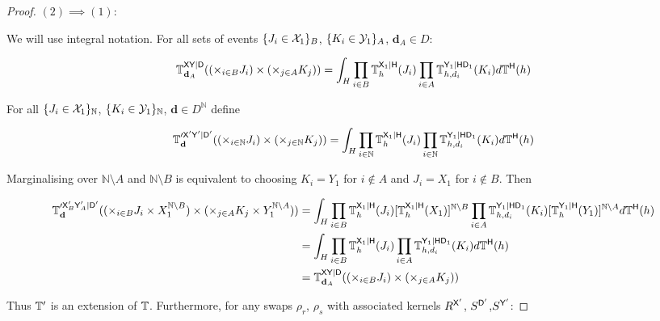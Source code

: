 \begin{proof}
$(2)\implies (1)$:

We will use integral notation. For all sets of events $\{J_i\in \mathcal{X}_1\}_B$, $\{K_i\in \mathcal{Y}_1\}_A$, $\mathbf{d}_A\in D$:

\begin{align}
  \mathbb{T}^{\mathsf{X}\mathsf{Y}|\mathsf{D}}_{\mathbf{d}_A}((\times_{i\in B}J_i)\times (\times_{j\in A} K_j)) = \int_{H} \prod_{i\in B} \mathbb{T}^{\mathsf{X}_1|\mathsf{H}}_h(J_i)\prod_{i\in A}\mathbb{T}_{h,d_i}^{\mathsf{Y}_1|\mathsf{H}\mathsf{D}_1}(K_i)d\mathbb{T}^{\mathsf{H}}(h)
\end{align}

For all $\{J_i\in \mathcal{X}_1\}_\mathbb{N}$, $\{K_i\in \mathcal{Y}_1\}_\mathbb{N}$, $\mathbf{d} \in D^{\mathbb{N}}$ define

\begin{align}
  \mathbb{T}^{\prime \mathsf{X}'\mathsf{Y}'|\mathsf{D}'}_{\mathbf{d}}((\times_{i\in \mathbb{N}}J_i)\times (\times_{j\in \mathbb{N}} K_j)) = \int_{H} \prod_{i\in \mathbb{N}} \mathbb{T}^{\mathsf{X}_1|\mathsf{H}}_h(J_i)\prod_{i\in \mathbb{N}}\mathbb{T}_{h,d_i}^{\mathsf{Y}_1|\mathsf{H}\mathsf{D}_1}(K_i)d\mathbb{T}^{\mathsf{H}}(h)
\end{align}

Marginalising over $\mathbb{N}\setminus A$ and $\mathbb{N}\setminus B$ is equivalent to choosing $K_i=Y_1$ for $i\not\in A$ and $J_i=X_1$ for $i\not\in B$. Then

\begin{align}
  \mathbb{T}^{\prime \mathsf{X}'_B\mathsf{Y}'_A|\mathsf{D}'}_{\mathbf{d}}((\times_{i\in B}J_i\times X_1^{\mathbb{N}\setminus B})\times (\times_{j\in A} K_j\times Y_1^{\mathbb{N}\setminus A})) &= \int_{H} \prod_{i\in B} \mathbb{T}^{\mathsf{X}_1|\mathsf{H}}_h(J_i) [\mathbb{T}^{\mathsf{X}_1|\mathsf{H}}_h (X_1)]^{\mathbb{N}\setminus B} \prod_{i\in A}\mathbb{T}_{h,d_i}^{\mathsf{Y}_1|\mathsf{H}\mathsf{D}_1}(K_i)[\mathbb{T}^{\mathsf{Y}_1|\mathsf{H}}_h (Y_1)]^{\mathbb{N}\setminus A}d\mathbb{T}^{\mathsf{H}}(h)\\
  &= \int_{H} \prod_{i\in B} \mathbb{T}^{\mathsf{X}_1|\mathsf{H}}_h(J_i) \prod_{i\in A}\mathbb{T}_{h,d_i}^{\mathsf{Y}_1|\mathsf{H}\mathsf{D}_1}(K_i)d\mathbb{T}^{\mathsf{H}}(h)\\
  &= \mathbb{T}^{\mathsf{X}\mathsf{Y}|\mathsf{D}}_{\mathbf{d}_A}((\times_{i\in B}J_i)\times (\times_{j\in A} K_j))
\end{align}

Thus $\mathbb{T}'$ is an extension of $\mathbb{T}$. Furthermore, for any swaps $\rho_r$, $\rho_s$ with associated kernels $R^{\mathsf{X}'}$, $S^{\mathsf{D}'}$,$S^{\mathsf{Y'}}$:


\end{proof}
